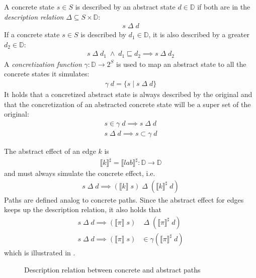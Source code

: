 A concrete state $s \in S$ is described by an abstract state $d \in \mathbb{D}$ if both are in the \textit{description relation} $\Delta \subseteq S \times \mathbb{D}$:
\begin{align}
s \;\Delta\; d
\end{align}
If a concrete state $s \in S$ is described by $d_1 \in \mathbb{D}$, it is also described by a greater $d_2 \in \mathbb{D}$:
\begin{align}
s \;\Delta\; d_1 \;\wedge\; d_1 \sqsubseteq d_2 \implies s \;\Delta\; d_2
\end{align}
A \textit{concretization function} $\gamma : \mathbb{D} \to 2^S$ is used to map an abstract state to all the concrete states it simulates:
\begin{align}
\gamma \; d = \{s \; | \; s \;\Delta\; d\}
\end{align}
It holds that a concretized abstract state is always described by the original and that the concretization of an abstracted concrete state will be a super set of the original:
\begin{align}
s \in \gamma \; d \implies s \;\Delta\; d\\
s \;\Delta\; d \implies s \subset \gamma \; d
\end{align}


The abstract effect of an edge $k$ is
\begin{align}
\llbracket k \rrbracket^\sharp = \llbracket lab \rrbracket^\sharp : \mathbb{D} \to \mathbb{D}
\end{align}
and must always simulate the concrete effect, i.e.
\begin{align}
s \;\Delta\; d \implies (\llbracket k \rrbracket\; s) \;\Delta\; (\llbracket k \rrbracket^\sharp\; d)
\end{align}
Paths are defined analog to concrete paths.
Since the abstract effect for edges keeps up the description relation, it also holds that
\begin{align}
s \;\Delta\; d \implies (\llbracket \pi \rrbracket\; s) &\;\Delta\; (\llbracket \pi \rrbracket^\sharp\; d)\\
s \;\Delta\; d \implies (\llbracket \pi \rrbracket\; s) &\in \gamma (\llbracket \pi \rrbracket^\sharp\; d)
\end{align}
which is illustrated in .
\begin{figure}[ht]
\centering
{}
  \caption{Description relation between concrete and abstract paths \cite{seidl2009uebersetzerbau}}
  \label{fig:descrRel}
\end{figure}

